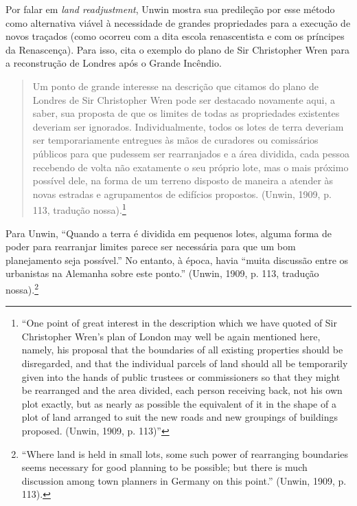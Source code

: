 \documentclass[12pt, a4paper]{book} %
\begin{document}
        Por falar em \textit{land readjustment}, Unwin mostra sua predileção por esse método como alternativa viável à necessidade de grandes propriedades para a execução de novos traçados (como ocorreu com a dita escola renascentista e com os príncipes da Renascença). Para isso, cita o exemplo do plano de Sir Christopher Wren para a reconstrução de Londres após o Grande Incêndio. 

        \begin{quotation}
            Um ponto de grande interesse na descrição que citamos do plano de Londres de Sir Christopher Wren pode ser destacado novamente aqui, a saber, sua proposta de que os limites de todas as propriedades existentes deveriam ser ignorados. Individualmente, todos os lotes de terra deveriam ser temporariamente entregues às mãos de curadores ou comissários públicos para que pudessem ser rearranjados e a área dividida, cada pessoa recebendo de volta não exatamente o seu próprio lote, mas o mais próximo possível dele, na forma de um terreno disposto de maneira a atender às novas estradas e agrupamentos de edifícios propostos.
            (Unwin, 1909, p. 113, tradução nossa).\footnote[32]{``One point of great interest in the description which we have quoted of Sir Christopher Wren's plan of London may well be again mentioned here, namely, his proposal that the boundaries of all existing properties should be disregarded, and that the individual parcels of land should all be temporarily given into the hands of public trustees or commissioners so that they might be rearranged and the area divided, each person receiving back, not his own plot exactly, but as nearly as possible the equivalent of it in the shape of a plot of land arranged to suit the new roads and new groupings of buildings proposed. (Unwin, 1909, p. 113)''}
        \end{quotation}

        Para Unwin, ``Quando a terra é dividida em pequenos lotes, alguma forma de poder para rearranjar limites parece ser necessária para que um bom planejamento seja possível.'' No entanto, à época, havia ``muita discussão entre os urbanistas na Alemanha sobre este ponto.'' (Unwin, 1909, p. 113, tradução nossa).\footnote[33]{``Where land is held in small lots, some such power of rearranging boundaries seems necessary for good planning to be possible; but there is much discussion among town planners in Germany on this point.'' (Unwin, 1909, p. 113).} 
        
\end{document}
